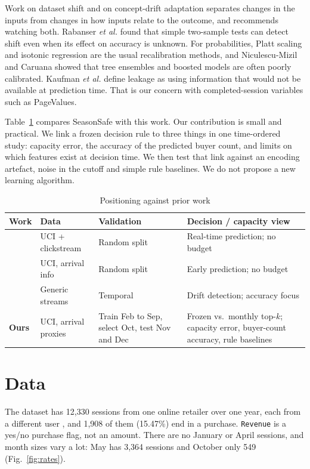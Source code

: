 \documentclass[conference]{IEEEtran}
\begin{document}
Work on dataset shift \cite{b10} and on concept-drift adaptation \cite{b7} separates changes in the
inputs from changes in how inputs relate to the outcome, and recommends watching both. Rabanser
\emph{et al.} \cite{b8} found that simple two-sample tests can detect shift even when its effect on
accuracy is unknown. For probabilities, Platt scaling \cite{b11} and isotonic regression \cite{b12} are
the usual recalibration methods, and Niculescu-Mizil and Caruana \cite{b13} showed that tree ensembles
and boosted models are often poorly calibrated. Kaufman \emph{et al.} \cite{b14} define leakage as using
information that would not be available at prediction time. That is our concern with completed-session
variables such as PageValues.

Table~\ref{tab:rw} compares SeasonSafe with this work. Our contribution is small and practical. We link
a frozen decision rule to three things in one time-ordered study: capacity error, the accuracy of the
predicted buyer count, and limits on which features exist at decision time. We then test that link
against an encoding artefact, noise in the cutoff and simple rule baselines. We do not propose a new
learning algorithm.

\begin{table}[t]
\caption{Positioning against prior work}\label{tab:rw}
\centering\footnotesize
\begin{tabular}{@{}p{1.25cm}p{1.6cm}p{1.45cm}p{2.6cm}@{}}
\toprule
Work & Data & Validation & Decision / capacity view\\
\midrule
\cite{b2} & UCI + clickstream & Random split & Real-time prediction; no budget\\
\cite{b3} & UCI, arrival info & Random split & Early prediction; no budget\\
\cite{b7,b8} & Generic streams & Temporal & Drift detection; accuracy focus\\
\textbf{Ours} & UCI, arrival proxies & Train Feb to Sep, select Oct, test Nov and Dec & Frozen vs.\ monthly top-$k$; capacity error, buyer-count accuracy, rule baselines\\
\bottomrule
\end{tabular}
\end{table}

\section{Data}
The dataset has 12,330 sessions from one online retailer over one year, each from a different user
\cite{b1}, and 1,908 of them (15.47\%) end in a purchase. \texttt{Revenue} is a yes/no purchase flag,
not an amount. There are no January or April sessions, and month sizes vary a lot: May has 3,364
sessions and October only 549 (Fig.~\ref{fig:rates}).
\end{document}
